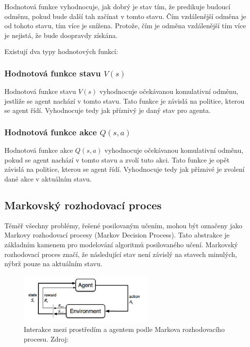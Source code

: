   Hodnotová funkce vyhodnocuje, jak dobrý je stav tím, že predikuje budoucí odměnu, pokud bude další tah začínat v tomto stavu.
  Čím vzdálenější odměna je od tohoto stavu, tím více je snížena.
  Protože, čím je odměna vzdálenější tím více je nejistá, že bude doopravdy získána.

  Existují dva typy hodnotových funkcí:

  \subsubsection*{Hodnotová funkce stavu $V(s)$}

  Hodnotová funkce stavu \emph{$V(s)$} vyhodnocuje očekávanou komulativní odměnu, jestliže se agent nachází v tomto stavu.
  Tato funkce je závislá na politice, kterou se agent řídí.
  Vyhodnocuje tedy jak příznivý je daný stav pro agenta.

  \subsubsection*{Hodnotová funkce akce $Q(s, a)$}
  \label{subsubsec:q_function}

  Hodnotová funkce akce \emph{$Q(s, a)$} vyhodnocuje očekávanou komulativní odměnu, pokud se agent nachází v tomto stavu a zvolí tuto akci.
  Tato funkce je opět závislá na politice, kterou se agent řídí.
  Vyhodnocuje tedy jak příznivé je zvolení dané akce v aktuálním stavu.

\subsection{Markovský rozhodovací proces}\label{subsec:markovsky-rozhodovaci-proces}

Téměř všechny problémy, řešené posilovaným učením, mohou být označeny jako Markovy rozhodovací procesy (Markov Decision Process).
Tato abstrakce je základním kamenem pro modelování algoritmů posilovaného učení.
Markovský rozhodovací proces značí, že následující stav není závislý na stavech minulých, nýbrž pouze na aktuálním stavu.

\begin{figure}[H]
	\centering
	\includegraphics[width=0.6\textwidth]{obrazky-figures/RL_basics}
	\caption{Interakce mezi prostředím a agentem podle Markova rozhodovacího procesu.
  Zdroj: \cite{RL_basics}}\label{fig:markov}
\end{figure}

